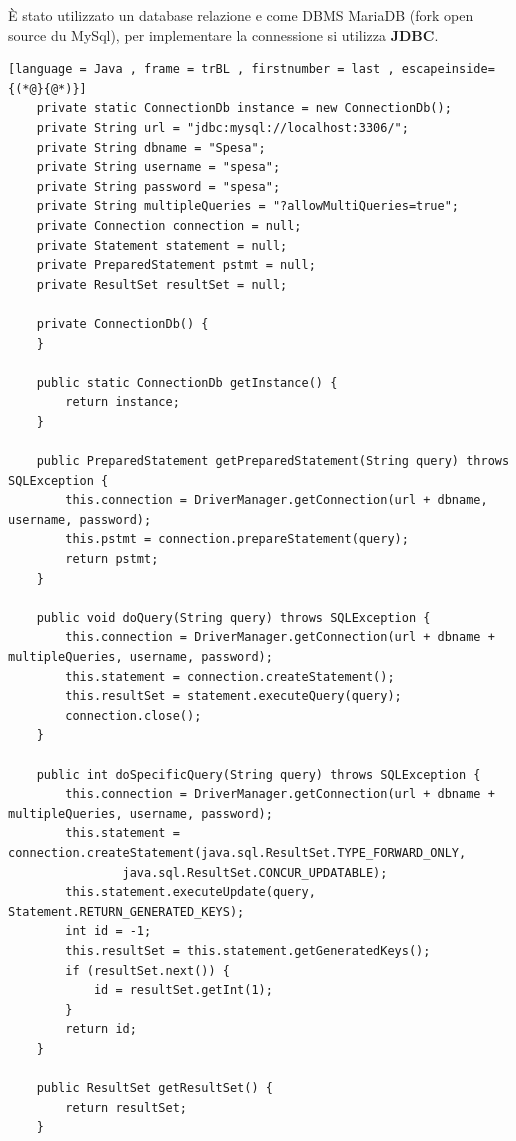 \documentclass{article}
\begin{document}
\noindent \`E stato utilizzato un database relazione e come DBMS MariaDB (fork open source du MySql),
per implementare la connessione si utilizza \textbf{JDBC}.
\newpage
\begin{lstlisting}[language = Java , frame = trBL , firstnumber = last , escapeinside={(*@}{@*)}]
    private static ConnectionDb instance = new ConnectionDb();
    private String url = "jdbc:mysql://localhost:3306/";
    private String dbname = "Spesa";
    private String username = "spesa";
    private String password = "spesa";
    private String multipleQueries = "?allowMultiQueries=true";
    private Connection connection = null;
    private Statement statement = null;
    private PreparedStatement pstmt = null;
    private ResultSet resultSet = null;

    private ConnectionDb() {
    }

    public static ConnectionDb getInstance() {
        return instance;
    }

    public PreparedStatement getPreparedStatement(String query) throws SQLException {
        this.connection = DriverManager.getConnection(url + dbname, username, password);
        this.pstmt = connection.prepareStatement(query);
        return pstmt;
    }

    public void doQuery(String query) throws SQLException {
        this.connection = DriverManager.getConnection(url + dbname + multipleQueries, username, password);
        this.statement = connection.createStatement();
        this.resultSet = statement.executeQuery(query);
        connection.close();
    }

    public int doSpecificQuery(String query) throws SQLException {
        this.connection = DriverManager.getConnection(url + dbname + multipleQueries, username, password);
        this.statement = connection.createStatement(java.sql.ResultSet.TYPE_FORWARD_ONLY,
                java.sql.ResultSet.CONCUR_UPDATABLE);
        this.statement.executeUpdate(query, Statement.RETURN_GENERATED_KEYS);
        int id = -1;
        this.resultSet = this.statement.getGeneratedKeys();
        if (resultSet.next()) {
            id = resultSet.getInt(1);
        }
        return id;
    }

    public ResultSet getResultSet() {
        return resultSet;
    }
\end{lstlisting}
\newpage
\end{document}
